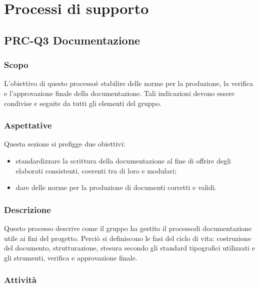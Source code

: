 \section{Processi di supporto}
    \subsection{PRC-Q3 Documentazione}
        \subsubsection{Scopo}
            L'obiettivo di questo processo\glosp è stabilire delle norme per la produzione, la verifica e l'approvazione finale della documentazione. Tali indicazioni devono essere condivise e seguite da tutti gli elementi del gruppo.
        \subsubsection{Aspettative}
            Questa sezione si prefigge due obiettivi:
            \begin{itemize}
                \item standardizzare la scrittura della documentazione al fine di offrire degli elaborati consistenti, coerenti tra di loro e modulari;
                \item dare delle norme per la produzione di documenti corretti e validi.
            \end{itemize}
        \subsubsection{Descrizione}
        	Questo processo descrive come il gruppo ha gestito il processo\glosp di documentazione utile ai fini del progetto\glo.
        	Perciò si definiscono le fasi del ciclo di vita: costruzione del documento, strutturazione, stesura secondo gli standard tipografici utilizzati e gli strumenti, verifica e approvazione finale.
        \subsubsection{Attività}
